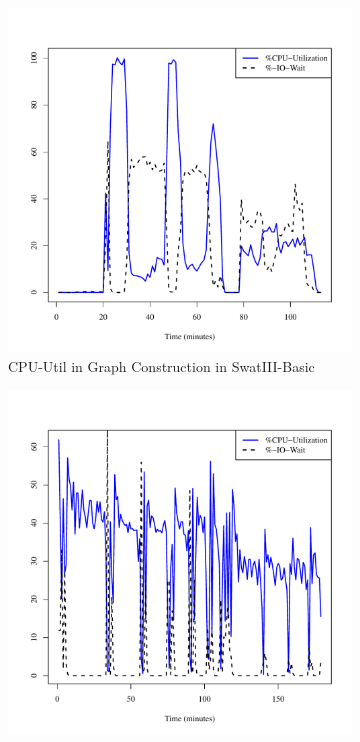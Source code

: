 \documentclass[conference]{IEEEtran}
\begin{document}
\begin{figure}[htb]
\centering
        \begin{subfigure}[b]{0.3\textwidth}
                \includegraphics[width=\textwidth]{Figure/SystemData/Plots/BGCPUHDD.pdf}
                \caption{CPU-Util in Graph Construction in SwatIII-Basic}
                \label{fig:BGCPUHDD}
        \end{subfigure}
		\begin{subfigure}[b]{0.3\textwidth}
                \includegraphics[width=\textwidth]{Figure/SystemData/Plots/ECCPUHDD.pdf}

\end{subfigure}
\end{figure}
\end{document}
